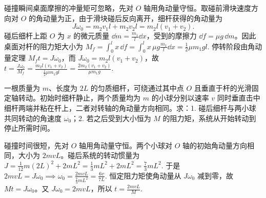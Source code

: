 \begin{solution}
碰撞瞬间桌面摩擦的冲量矩可忽略，先对 \(O\) 轴用角动量守恒。取碰前滑块速度方向对 \(O\) 的角动量为正，由于滑块碰后反向离开，细杆获得的角动量为
\[
J\omega_0=m_2v_1l+m_2v_2l=m_2l(v_1+v_2).
\]
碰后细杆上距 \(O\) 为 \(x\) 的微元质量 \(\dd m=\frac{m_1}{l}\dd x\)，受到的摩擦力 \(\dd f=\mu g\,\dd m\)。因此桌面对杆的阻力矩大小为
 \(M_f=\int_0^l x\,\dd f =\int_0^l x\,\mu g\frac{m_1}{l}\dd x =\frac12\mu m_1gl.\) 
停转阶段由角动量定理 \(M_ft=J\omega_0\)，而 \(J\omega_0=m_2l(v_1+v_2)\)，故
 \(t=\frac{J\omega_0}{M_f} =\frac{m_2l(v_1+v_2)}{\frac12\mu m_1gl} =\frac{2m_2(v_1+v_2)}{\mu m_1g}.\) 
\end{solution}

\begin{exercise}
一根质量为 \(m\)、长度为 \(2L\) 的匀质细杆，可绕通过其中点 \(O\) 且垂直于杆的光滑固定轴转动。初始时细杆静止，两个质量均为 \(m\) 的小球分别以速率 \(v\) 同时垂直击中细杆两端并粘在杆上，二者对转轴的角动量方向相同。求：1. 碰后细杆与两小球共同转动的角速度 \(\omega_0\)；2. 若之后受到大小恒为 \(M\) 的阻力矩，系统从开始转动到停止所需时间。
\end{exercise}

\begin{solution}
碰撞时间很短，先对 \(O\) 轴用角动量守恒。两个小球对 \(O\) 轴的初始角动量方向相同，大小为 \(2mvL\)。碰后系统的转动惯量为
 \(J=\frac{1}{12}m(2L)^2+2mL^2 =\frac13mL^2+2mL^2 =\frac73mL^2.\) 
于是
 \(2mvL=J\omega_0 \implies \omega_0=\frac{2mvL}{\frac73mL^2} =\frac{6v}{7L}.\) 
恒定阻力矩使角动量从 \(J\omega_0\) 减到零，故 \(Mt=J\omega_0\)。又 \(J\omega_0=2mvL\)，所以
 \(t=\frac{2mvL}{M}.\) 
\end{solution}
